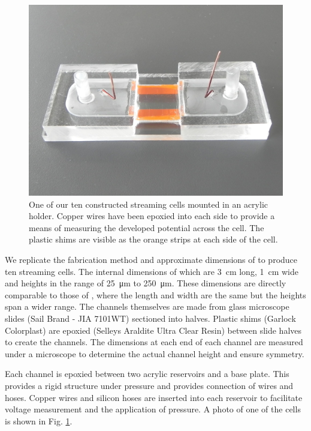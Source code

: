 \documentclass[10pt,final,journal]{IEEEtran}
\begin{document}
    \begin{figure}
        \begin{center}
        \includegraphics[width=\linewidth]{Photo_streamingPotential_Assembly_Step3.JPG}
        \end{center}
        \caption{One of our ten constructed streaming cells mounted in an acrylic holder. Copper wires have been epoxied into each side to provide a means of measuring the developed potential across the cell. The plastic shims are visible as the orange strips at each side of the cell.}
        \label{fig:cell}
    \end{figure}

    We replicate the fabrication method and approximate dimensions of \cite{Gu2000} to produce ten streaming cells.
    The internal dimensions of which are \SI{3}{\centi\metre} long, \SI{1}{\centi\metre} wide and heights in the range of \SI{25}{\micro\metre} to \SI{250}{\micro\metre}.
    These dimensions are directly comparable to those of \cite{Gu2000}, where the length and width are the same but the heights span a wider range.
    The channels themselves are made from glass microscope slides (Sail Brand - JIA 7101WT) sectioned into halves.
    Plastic shims (Garlock Colorplast) are epoxied (Selleys Araldite Ultra Clear Resin) between slide halves to create the channels.
    The dimensions at each end of each channel are measured under a microscope to determine the actual channel height and ensure symmetry.

    Each channel is epoxied between two acrylic reservoirs and a base plate.
    This provides a rigid structure under pressure and provides connection of wires and hoses.
    Copper wires and silicon hoses are inserted into each reservoir to facilitate voltage measurement and the application of pressure.
    A photo of one of the cells is shown in Fig. \ref{fig:cell}.
\end{document}

